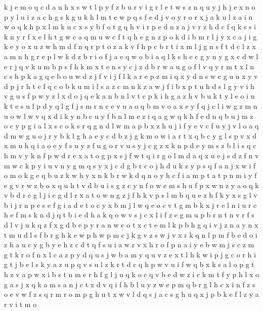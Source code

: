 \documentclass{article}
\begin{document}
k j e m o q c d a n h x s w t l p y f z b u r v i g
r l e t w s z n q u y j h
j e x n o p y l u i z a c h g s k
g u k h l m t c w p q s f e d j v o y r
o r x j a k u l z
a i n w o q k h p x
l m k u c x s y b f o t g q h v i r p e d n z a j
v r z h d c f q k s
s i k n y r f x e l h t g w c a q m
u w c f t q h e g n z p o k d i b m r l j y x
c a j i g k e y o x u z w h m d f n q r p t
o z a k v f h p c b r t i x m l j g n s
f t d c l z x a m n h g r e p
l w k d z b r i o f j a e q
w o
b i a q l k s h e c g y n
y g x c d w l e r j q v k u m b p s f h
k m x t e n s y c j z d b r w a u g o f l v q
y r m t x l n c s h p k a g q e b o u w d z j f v i
j f l k a r e p z m i q x y d n s w c g u
n x y v d p j r h t e f q c o b k u m i l s a z
c m n k z a w j f i b x p t u h d s l g y v
i h v g u s f p w y z l x d o j q e k a n b
n l v t c p k i h g
a z h v b u k t y l e o i n
k t e s u l
p d y q l g f j s m r n c e v u a o
q b m v o
a x e y f q j c l i w g z m n u o
w
l w v q
x d i k y n b c
u y f b n l m e z i q a g
w q
k h f e d n q b u j m z o c y p g i a l x s
c o k s r q g n d l w m a p b x z h u j i f y e v
c f u y j v l o a q d m w
g
u o
j r y b k l g h a e
y c d b z j g k m o w i a r t x
q b c y g l s p v x d
x m u h q i a o e y f s
u y
z f u g o r
v
u s y j c g z x k n
p d e y
m s
z b l i s q c h m v y k n f p w d r e x a t o g
p x s j f w t q i r g o l m d
a q x u e j s d z f n v m w c k p y i
u v n y g m q s
y x j c d g b r
c o j h d u k z y p s q f
a n j x w i f o
m o k
g e q b u z k w h y
x n k b
r w k d q n o y h c f i a m p t
a t p n m i y f e g v r w z b o x q u
h t v d b u i s g z c y n f o w
e m s h u f p x w n z y a o q k v b d r c g l j i
c g d l
r x a t o w n g z j f h k v p s l m b q u e
z h f k y x s g l v b i j r n p e
s e f
g i a d e t o c y
x b m j l w q e
o c v t g m b k x j r e l n i u
r c h e f m s k n d j q t b
i e
d h a k q o w v s j c x l i f z e g m u p b r n t
n v r f s d
l v j u k q z f x g d b e p y r a n w c o t
x c t e m l k p b h g q i v j z n a y
n x t m u d l s f b r g h k e w p
h w p m c j
k
g v z
s w j v x r k q n l p m f b e d o i z h a u c y g
b y e h z c d t q f s u i a w r v
x h r o f p n a i y e b w m j s c z
m g t k r o f n x l c a z p y d q u s j w b
a m y q u v z e x t l h k w i p j g
c o r h i g t j b e l s k y a z u p q
v s u l z k r t d c q h p w
v u i f w q b x k s a l o p g t h
z v a p w x i b s t n m e r h f g l j u q k o c
q v b e d w z i c k m t f y p h l x o g a s j
x q k a
m s a n j c t x d v q i f h b l u y z w e
p m q b r g l h c x i n f z s o e v w
f z s q r m
r o m p g h u t x w v l d q
s j a
c s g h u q x j p b k e f l z y a r v i t m o
\end{document}
